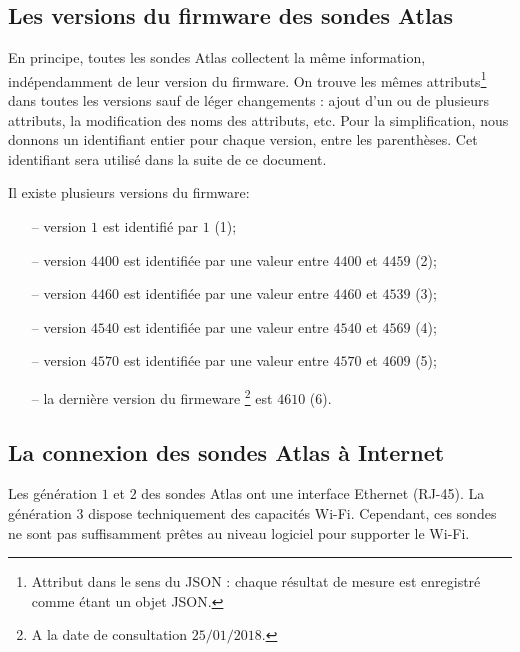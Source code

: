 \subsection{Les versions du firmware des sondes Atlas} \label{subsec:firmwareversion}
En principe, toutes les sondes Atlas collectent la même information, indépendamment de leur version du firmware. On trouve les mêmes attributs\footnote{Attribut dans le sens du JSON : chaque résultat de mesure est enregistré comme étant un objet JSON.}  dans toutes les versions sauf de léger changements : ajout d'un ou de plusieurs attributs, la modification des noms des attributs, etc. Pour la simplification, nous donnons un identifiant entier pour chaque version, entre les parenthèses. Cet identifiant sera utilisé dans la suite de ce document. 



Il existe plusieurs versions du firmware:
\begin{itemize}
	\setlength\itemsep{0.1 cm}
	\item[--] version $1$ est identifié par  $1$ (1);
	\item[--] version $4400$  est identifiée par une valeur entre  $4400$ et $4459$ (2);
	\item[--] version $4460$ est identifiée par une valeur entre $4460$ et $4539$ (3);
	\item[--] version $4540$  est identifiée par une valeur entre  $4540$ et $4569$ (4);
	\item[--]  version $4570$  est identifiée par une valeur entre $4570$ et $4609$ (5);
	\item[--] la dernière version du firmeware \footnote{A la date de consultation $ 25/01/2018 $.} est $4610$ (6). 
\end{itemize}

\subsection{La connexion des sondes Atlas à Internet}

Les génération $1$ et $2$ des sondes  Atlas ont une interface Ethernet (RJ-45). La génération $3$ dispose techniquement des capacités Wi-Fi. Cependant, ces sondes ne sont pas suffisamment prêtes au niveau logiciel pour supporter le Wi-Fi.

